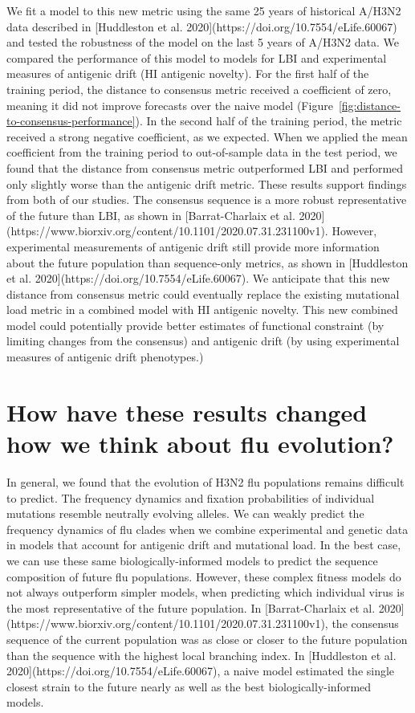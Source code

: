 We fit a model to this new metric using the same 25 years of historical A/H3N2 data described in [Huddleston et al. 2020](https://doi.org/10.7554/eLife.60067) and tested the robustness of the model on the last 5 years of A/H3N2 data.
We compared the performance of this model to models for LBI and experimental measures of antigenic drift (HI antigenic novelty).
For the first half of the training period, the distance to consensus metric received a coefficient of zero, meaning it did not improve forecasts over the naive model (Figure~\ref{fig:distance-to-consensus-performance}).
In the second half of the training period, the metric received a strong negative coefficient, as we expected.
When we applied the mean coefficient from the training period to out-of-sample data in the test period, we found that the distance from consensus metric outperformed LBI and performed only slightly worse than the antigenic drift metric.
These results support findings from both of our studies.
The consensus sequence is a more robust representative of the future than LBI, as shown in [Barrat-Charlaix et al. 2020](https://www.biorxiv.org/content/10.1101/2020.07.31.231100v1).
However, experimental measurements of antigenic drift still provide more information about the future population than sequence-only metrics, as shown in [Huddleston et al. 2020](https://doi.org/10.7554/eLife.60067).
We anticipate that this new distance from consensus metric could eventually replace the existing mutational load metric in a combined model with HI antigenic novelty.
This new combined model could potentially provide better estimates of functional constraint (by limiting changes from the consensus) and antigenic drift (by using experimental measures of antigenic drift phenotypes.)

\section{How have these results changed how we think about flu evolution?}

In general, we found that the evolution of H3N2 flu populations remains difficult to predict.
The frequency dynamics and fixation probabilities of individual mutations resemble neutrally evolving alleles.
We can weakly predict the frequency dynamics of flu clades when we combine experimental and genetic data in models that account for antigenic drift and mutational load.
In the best case, we can use these same biologically-informed models to predict the sequence composition of future flu populations.
However, these complex fitness models do not always outperform simpler models, when predicting which individual virus is the most representative of the future population.
In [Barrat-Charlaix et al. 2020](https://www.biorxiv.org/content/10.1101/2020.07.31.231100v1), the consensus sequence of the current population was as close or closer to the future population than the sequence with the highest local branching index.
In [Huddleston et al. 2020](https://doi.org/10.7554/eLife.60067), a naive model estimated the single closest strain to the future nearly as well as the best biologically-informed models.

